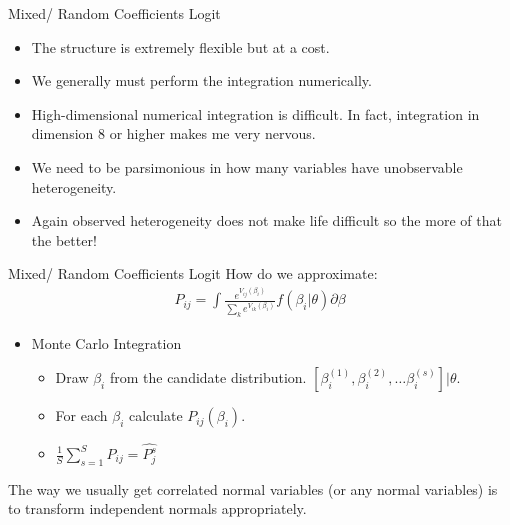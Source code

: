 \documentclass[xcolor=pdftex,dvipsnames,table,mathserif]{beamer}
\begin{document}
\begin{frame}{Mixed/ Random Coefficients Logit}
\begin{itemize}
\item The structure is extremely flexible but at a cost.
\item We generally must perform the integration numerically.
\item High-dimensional numerical integration is difficult. In fact, integration in dimension 8 or higher makes me very nervous.
\item We need to be parsimonious in how many variables have unobservable heterogeneity.
\item Again observed heterogeneity does not make life difficult so the more of that the better!
\end{itemize}
\end{frame}

\begin{frame}{Mixed/ Random Coefficients Logit}
How do we approximate:
\begin{eqnarray*}
P_{ij} = \int \frac{ e^{V_{ij}(\beta_i)}}{\sum_k e^{V_{ik}(\beta_i)}} f(\beta_i | \theta) \partial \beta
\end{eqnarray*}

\begin{itemize}
\item Monte Carlo Integration
\begin{itemize}
\item Draw $\beta_i$ from the candidate distribution. $[\beta_i^{(1)}, \beta_i^{(2)}, \ldots\beta_i^{(s)}] | \theta$.
\item For each $\beta_i$ calculate $P_{ij}(\beta_i)$.
\item $\frac{1}{S} \sum_{s=1}^S P_{ij} = \widehat{P_{j}^{s}}$
\end{itemize}
\end{itemize}
The way we usually get correlated normal variables (or any normal variables) is to transform independent normals appropriately.
\end{frame}
\end{document}
